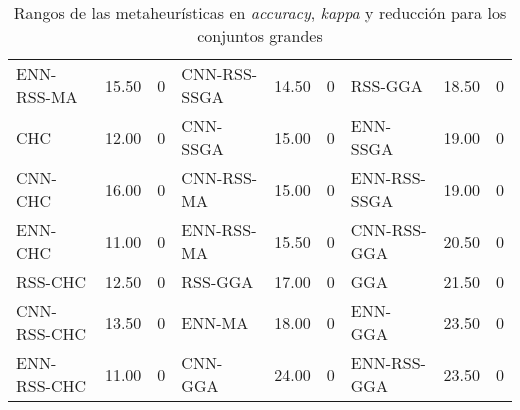 \begin{table}[]
\begin{adjustbox}{max width =\textwidth}
\begin{tabular}{l c c|l c c|l c c}
ENN-RSS-MA   & 15.50 & 0 & CNN-RSS-SSGA & 14.50 & 0 & RSS-GGA      & 18.50 & 0 \\
CHC          & 12.00 & 0 & CNN-SSGA     & 15.00 & 0 & ENN-SSGA     & 19.00 & 0 \\
CNN-CHC      & 16.00 & 0 & CNN-RSS-MA   & 15.00 & 0 & ENN-RSS-SSGA & 19.00 & 0 \\
ENN-CHC      & 11.00 & 0 & ENN-RSS-MA   & 15.50 & 0 & CNN-RSS-GGA  & 20.50 & 0 \\
RSS-CHC      & 12.50 & 0 & RSS-GGA      & 17.00 & 0 & GGA          & 21.50 & 0 \\
CNN-RSS-CHC  & 13.50 & 0 & ENN-MA       & 18.00 & 0 & ENN-GGA      & 23.50 & 0 \\
ENN-RSS-CHC  & 11.00 & 0 & CNN-GGA      & 24.00 & 0 & ENN-RSS-GGA  & 23.50 & 0 \\


\hline
\end{tabular}
\end{adjustbox}
\caption{Rangos de las metaheurísticas en \emph{accuracy}, \emph{kappa} y reducción para los conjuntos grandes}
\label{rank1-large}
\end{table} 


